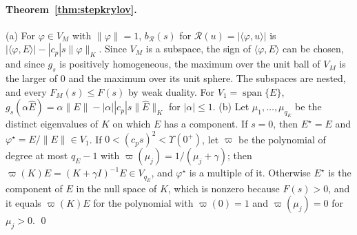 \documentclass[11pt]{article}
\theoremstyle{definition}
\theoremstyle{remark}
\newcommand{\Rgh}{\mathcal{R}}           %
\newcommand{\ip}[2]{\langle #1,#2\rangle}
\begin{document}
\paragraph{Theorem~\ref{thm:stepkrylov}.}
(a) For $\varphi\in V_M$ with $\|\varphi\| = 1$, $b_\Rgh(s)$ for $\Rgh(u) = |\ip{\varphi}{u}|$ is $|\ip{\varphi}{E}| - |c_p|s\|\varphi\|_K$.
Since $V_M$ is a subspace, the sign of $\ip{\varphi}{E}$ can be chosen, and since $g_s$ is positively homogeneous, the maximum over the unit ball of $V_M$ is the larger of $0$ and the maximum over its unit sphere.
The subspaces are nested, and every $F_M(s) \le F(s)$ by weak duality.
For $V_1 = \operatorname{span}\{E\}$, $g_s(\alpha\hat E) = \alpha\|E\| - |\alpha||c_p|s\|\hat E\|_K$ for $|\alpha|\le1$.
(b) Let $\mu_1,\dots,\mu_{q_E}$ be the distinct eigenvalues of $K$ on which $E$ has a component.
If $s = 0$, then $E^\star = E$ and $\varphi^\star = E/\|E\|\in V_1$.
If $0 < (c_ps)^2 < \Upsilon(0^+)$, let $\varpi$ be the polynomial of degree at most $q_E-1$ with $\varpi(\mu_j) = 1/(\mu_j+\gamma)$; then $\varpi(K)E = (K+\gamma I)^{-1}E \in V_{q_E}$, and $\varphi^\star$ is a multiple of it.
Otherwise $E^\star$ is the component of $E$ in the null space of $K$, which is nonzero because $F(s) > 0$, and it equals $\varpi(K)E$ for the polynomial with $\varpi(0) = 1$ and $\varpi(\mu_j) = 0$ for $\mu_j > 0$. \qed
\end{document}
